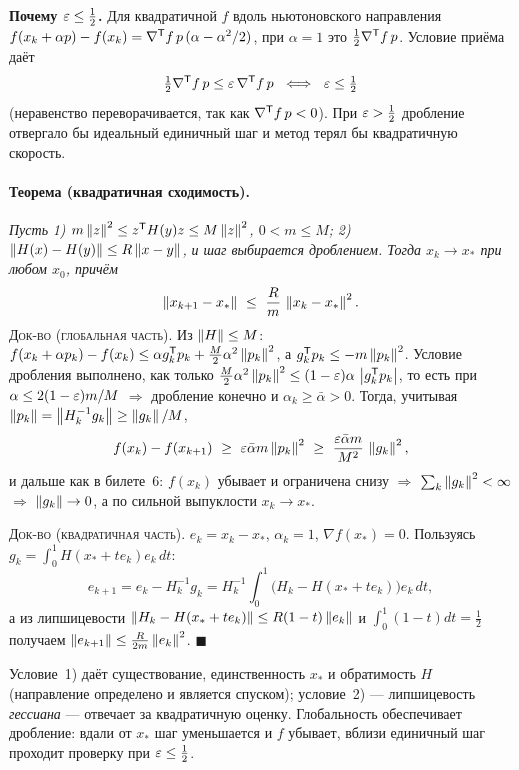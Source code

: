 \textbf{Почему $\varepsilon \le \tfrac12$.} Для квадратичной $f$ вдоль
ньютоновского направления $f(x_k + \alpha p) - f(x_k) =
\nabla^{\mathsf{T}} f\,p\,(\alpha - \alpha^2/2)$, при $\alpha = 1$ это
$\tfrac12\nabla^{\mathsf{T}} f\,p$. Условие приёма даёт
\[
  \tfrac12\nabla^{\mathsf{T}} f\,p \le \varepsilon\,\nabla^{\mathsf{T}} f\,p
  \ \iff\ \varepsilon \le \tfrac12
\]
(неравенство переворачивается, так как $\nabla^{\mathsf{T}} f\,p < 0$). При
$\varepsilon > \tfrac12$ дробление отвергало бы идеальный единичный шаг и метод терял
бы квадратичную скорость.

\paragraph{Теорема (квадратичная сходимость).}
\textit{Пусть}
\textit{1) $m\left\lVert z \right\rVert^2 \le z^{\mathsf{T}} H(y)z \le M\left\lVert z \right\rVert^2$, $0 < m \le M$;}
\textit{2) $\left\lVert H(x) - H(y) \right\rVert \le R\left\lVert x-y \right\rVert$,}
\textit{и шаг выбирается дроблением. Тогда $x_k \to x_*$ при любом $x_0$,
причём}
\[
  \norm{x_{k+1} - x_*} \ \le\ \frac{R}{m}\,\norm{x_k - x_*}^2 .
\]
\textsc{Док-во (глобальная часть).} Из $\left\lVert H \right\rVert \le M$:
$f(x_k+\alpha p_k) - f(x_k) \le \alpha g_k^{\mathsf{T}} p_k + \tfrac{M}{2}\alpha^2\left\lVert p_k \right\rVert^2$,
а $g_k^{\mathsf{T}} p_k \le -m\left\lVert p_k \right\rVert^2$. Условие дробления выполнено, как только
$\tfrac{M}{2}\alpha^2\left\lVert p_k \right\rVert^2 \le (1-\varepsilon)\alpha\,\left\lvert g_k^{\mathsf{T}} p_k \right\rvert$, то есть
при $\alpha \le 2(1-\varepsilon)m/M$ $\Rightarrow$ дробление конечно и
$\alpha_k \ge \bar\alpha > 0$. Тогда, учитывая
$\left\lVert p_k \right\rVert = \left\lVert H_k^{-1}g_k \right\rVert \ge \left\lVert g_k \right\rVert/M$,
\[
  f(x_k) - f(x_{k+1}) \ \ge\ \varepsilon\bar\alpha m \left\lVert p_k \right\rVert^2
   \ \ge\ \frac{\varepsilon\bar\alpha m}{M^2}\,\left\lVert g_k \right\rVert^2 ,
\]
и дальше как в билете~6: $f(x_k)$ убывает и ограничена снизу $\Rightarrow$
$\sum_k\left\lVert g_k \right\rVert^2 < \infty$ $\Rightarrow$ $\left\lVert g_k \right\rVert\to0$, а по сильной
выпуклости $x_k \to x_*$.

\textsc{Док-во (квадратичная часть).} $e_k = x_k - x_*$, $\alpha_k = 1$,
$\nabla f(x_*) = 0$. Пользуясь $g_k = \int_0^1 H(x_*+te_k)e_k\,dt$:
\[
  e_{k+1} = e_k - H_k^{-1}g_k
   = H_k^{-1}\int_0^1 \big(H_k - H(x_*+te_k)\big)e_k\,dt ,
\]
а из липшицевости $\left\lVert H_k - H(x_*+te_k) \right\rVert \le R(1-t)\left\lVert e_k \right\rVert$ и
$\int_0^1(1-t)dt = \tfrac12$ получаем
$\left\lVert e_{k+1} \right\rVert \le \tfrac{R}{2m}\left\lVert e_k \right\rVert^2$. $\blacksquare$

Условие~1) даёт существование, единственность $x_*$ и обратимость $H$
(направление определено и является спуском); условие~2) — липшицевость
\emph{гессиана} — отвечает за квадратичную оценку. Глобальность обеспечивает
дробление: вдали от $x_*$ шаг уменьшается и $f$ убывает, вблизи единичный шаг
проходит проверку при $\varepsilon \le \tfrac12$.

